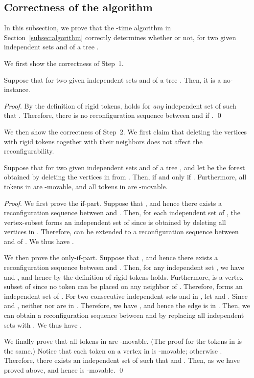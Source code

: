\documentclass{llncs}
\newcounter{two}
\begin{document}
	\subsection{Correctness of the algorithm}
	\label{subsec:correctness}

	In this subsection, we prove that the -time algorithm in Section~\ref{subsec:algorithm} correctly determines whether  or not, for two given independent sets  and  of a tree .
\smallskip
	
	We first show the correctness of Step~1.
	\begin{lemma} \label{lem:step1}
	Suppose that  for two given independent sets  and  of a tree . 
	Then, it is a no-instance.
	\end{lemma}
	\begin{proof}
	By the definition of rigid tokens,  holds for \emph{any} independent set  of  such that . 
	Therefore, there is no reconfiguration sequence between  and  if .
	\qed
	\end{proof}

	We then show the correctness of Step~2. 
	We first claim that deleting the vertices with rigid tokens together with their neighbors does not affect the reconfigurability. 
	\begin{lemma} \label{lem:step2}
	Suppose that  for two given independent sets  and  of a tree , and let  be the forest obtained by deleting the vertices in  from .
	Then,  if and only if .
	Furthermore, all tokens in  are -movable, and all tokens in  are -movable.
	\end{lemma}
	\begin{proof}
	We first prove the if-part. 
	Suppose that , and hence there exists a reconfiguration sequence  between  and . 
	Then, for each independent set  of , the vertex-subset  forms an independent set of  since  is obtained by deleting all vertices in . 
	Therefore,  can be extended to a reconfiguration sequence between  and  of . 
	We thus have . 
	
	We then prove the only-if-part. 
	Suppose that , and hence there exists a reconfiguration sequence  between  and . 
	Then, for any independent set , we have  and , and hence by the definition of rigid tokens  holds. 
	Furthermore,  is a vertex-subset of  since no token can be placed on any neighbor of . 
	Therefore,  forms an independent set of . 
	For two consecutive independent sets  and  in , let  and . 
	Since  and , neither  nor  are in .
	Therefore, we have , and hence the edge  is in . 
	Then, we can obtain a reconfiguration sequence between  and  by replacing all independent sets  with . 
	We thus have . 
\smallskip
	
	We finally prove that all tokens in  are -movable.
(The proof for the tokens in  is the same.)
	Notice that each token  on a vertex  in  is -movable; otherwise . 
	Therefore, there exists an independent set  of  such that  and . 
	Then,  as we have proved above, and hence  is -movable.
	\qed
	\end{proof}
\end{document}
